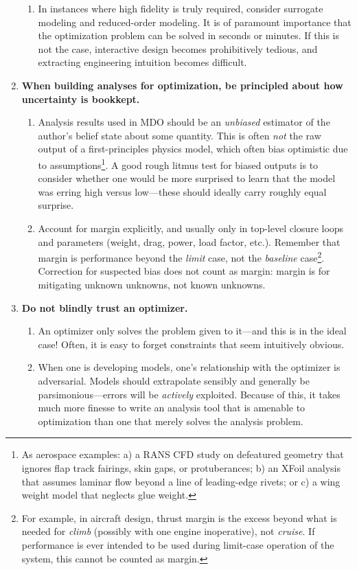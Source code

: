 \begin{enumerate}
\begin{enumerate}
        \item In instances where high fidelity is truly required, consider surrogate modeling and reduced-order modeling. It is of paramount importance that the optimization problem can be solved in seconds or minutes. If this is not the case, interactive design becomes prohibitively tedious, and extracting engineering intuition becomes difficult.
    \end{enumerate}
    \item \textbf{When building analyses for optimization, be principled about how uncertainty is bookkept.}
    \begin{enumerate}
        \item Analysis results used in MDO should be an \emph{unbiased} estimator of the author's belief state about some quantity. This is often \emph{not} the raw output of a first-principles physics model, which often bias optimistic due to assumptions\footnote{As aerospace examples: a) a RANS CFD study on defeatured geometry that ignores flap track fairings, skin gaps, or protuberances; b) an XFoil analysis that assumes laminar flow beyond a line of leading-edge rivets; or c) a wing weight model that neglects glue weight.}. A good rough litmus test for biased outputs is to consider whether one would be more surprised to learn that the model was erring high versus low—these should ideally carry roughly equal surprise.
        \item Account for margin explicitly, and usually only in top-level closure loops and parameters (weight, drag, power, load factor, etc.). Remember that margin is performance beyond the \emph{limit} case, not the \emph{baseline} case\footnote{For example, in aircraft design, thrust margin is the excess beyond what is needed for \emph{climb} (possibly with one engine inoperative), not \emph{cruise}. If performance is ever intended to be used during limit-case operation of the system, this cannot be counted as margin.}. Correction for suspected bias does not count as margin: margin is for mitigating unknown unknowns, not known unknowns.
    \end{enumerate}
    \item \textbf{Do not blindly trust an optimizer.}
    \begin{enumerate}
        \item An optimizer only solves the problem given to it—and this is in the ideal case! Often, it is easy to forget constraints that seem intuitively obvious.
        \item When one is developing models, one's relationship with the optimizer is adversarial. Models should extrapolate sensibly and generally be parsimonious—errors will be \emph{actively} exploited. Because of this, it takes much more finesse to write an analysis tool that is amenable to optimization than one that merely solves the analysis problem.

\end{enumerate}
\end{enumerate}

